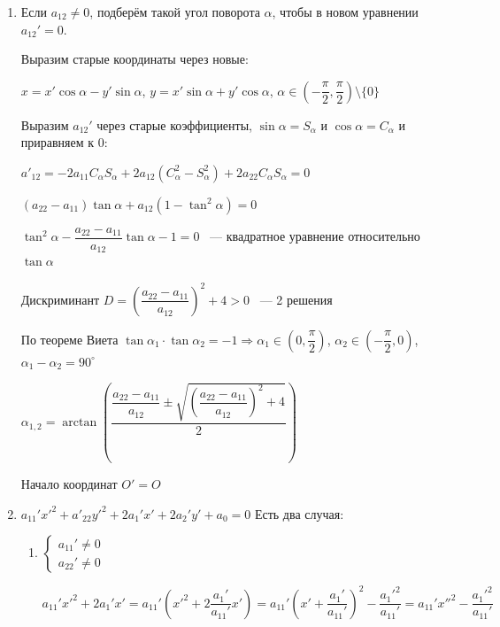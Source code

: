 \begin{enumerate}
    \item Если \(a_{12} \neq 0\), подберём такой угол поворота \(\alpha\), чтобы в новом уравнении \(a_{12}' = 0\).

          Выразим старые координаты через новые:

          \(x = x' \cos \alpha - y' \sin \alpha\), \(y = x' \sin \alpha + y' \cos \alpha\), \(\alpha \in \left(-\dfrac{\pi}{2}, \dfrac{\pi}{2}\right) \setminus \{0\}\)

          Выразим \(a_{12}'\) через старые коэффициенты, \(\sin \alpha = S_\alpha\) и \(\cos \alpha = C_\alpha\) и приравняем к \(0\):

          \(a'_{12} = -2 a_{11} C_\alpha S_\alpha + 2 a_{12} (C_\alpha^2 - S_\alpha^2) + 2 a_{22} C_\alpha S_\alpha = 0\)

          \((a_{22} - a_{11}) \tan \alpha + a_{12} (1 - \tan^2 \alpha) = 0\)

          \(\tan^2 \alpha - \dfrac{a_{22} - a_{11}}{a_{12}} \tan \alpha - 1 = 0\) ~--- квадратное уравнение относительно \(\tan \alpha\)

          Дискриминант \(D = \left(\dfrac{a_{22} - a_{11}}{a_{12}}\right) ^ 2 + 4 > 0\) ~--- 2 решения

          По теореме Виета \(\tan \alpha_1 \cdot \tan \alpha_2 = -1 \Rightarrow \alpha_1 \in \left(0, \dfrac{\pi}{2}\right)\), \(\alpha_2 \in \left(-\dfrac{\pi}{2}, 0\right)\), \(\alpha_1 - \alpha_2 = 90^\circ\)

          \(\alpha_{1, 2} = \arctan\left(\dfrac{\dfrac{a_{22} - a_{11}}{a_{12}} \pm \sqrt{\left(\dfrac{a_{22} - a_{11}}{a_{12}}\right) ^ 2 + 4}}{2}\right)\)

          Начало координат \(O' = O\)

    \item \(a_{11}' x'^2 + a'_{22} y'^2 + 2 a_1' x' + 2 a_2' y' + a_0 = 0\)
          Есть два случая:
          \begin{enumerate}
              \item \(\begin{cases}
                        a_{11}' \neq 0 \\
                        a_{22}' \neq 0
                    \end{cases}\)

                    \(a_{11}' x'^2 + 2 a_1' x' = a_{11}' \left(x'^2 + 2 \dfrac{a_1'}{a_{11}'} x'\right) = a_{11}' \left(x' + \dfrac{a_1'}{a_{11}'}\right)^2 - \dfrac{a_1'^2}{a_{11}'} = a_{11}' x''^2 - \dfrac{a_1'^2}{a_{11}'}\)


\end{enumerate}
\end{enumerate}
